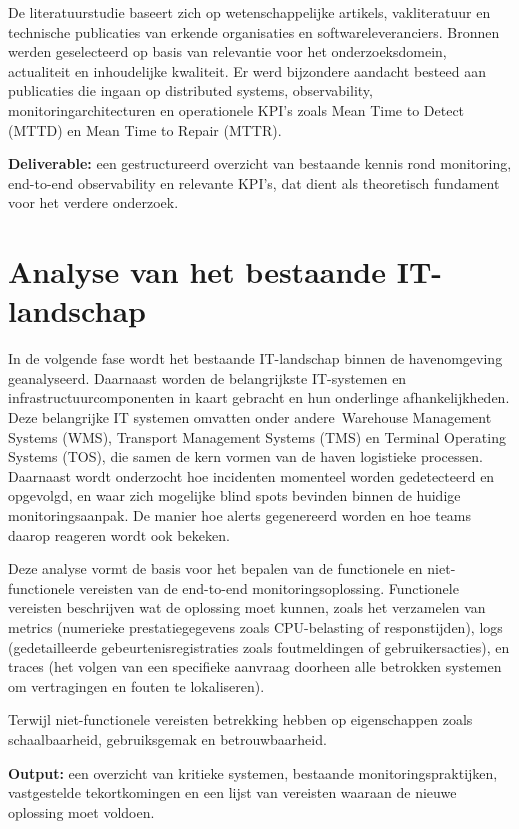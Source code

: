 De literatuurstudie baseert zich op wetenschappelijke artikels, vakliteratuur en technische publicaties van erkende organisaties en softwareleveranciers. Bronnen werden geselecteerd op basis van relevantie voor het onderzoeksdomein, actualiteit en inhoudelijke kwaliteit. Er werd bijzondere aandacht besteed aan publicaties die ingaan op distributed systems, observability, monitoringarchitecturen en operationele KPI’s zoals Mean Time to Detect (MTTD) en Mean Time to Repair (MTTR).

\textbf{Deliverable:} een gestructureerd overzicht van bestaande kennis rond monitoring, end-to-end observability en relevante KPI’s, dat dient als theoretisch fundament voor het verdere onderzoek.

\section{Analyse van het bestaande IT-landschap}

In de volgende fase wordt het bestaande IT-landschap binnen de havenomgeving geanalyseerd. Daarnaast worden de belangrijkste IT-systemen en infrastructuurcomponenten in kaart gebracht en hun onderlinge afhankelijkheden. Deze belangrijke IT systemen omvatten onder andere Warehouse Management Systems (WMS), Transport Management Systems (TMS) en Terminal Operating Systems (TOS), die samen de kern vormen van de haven logistieke processen. Daarnaast wordt onderzocht hoe incidenten momenteel worden gedetecteerd en opgevolgd, en waar zich mogelijke blind spots bevinden binnen de huidige monitoringsaanpak. De manier hoe alerts gegenereerd worden en hoe teams daarop reageren wordt ook bekeken.

Deze analyse vormt de basis voor het bepalen van de functionele en niet-functionele vereisten van de end-to-end monitoringsoplossing. Functionele vereisten beschrijven wat de oplossing moet kunnen, zoals het verzamelen van metrics (numerieke prestatiegegevens zoals CPU-belasting of responstijden), logs (gedetailleerde gebeurtenisregistraties zoals foutmeldingen of gebruikersacties), en traces (het volgen van een specifieke aanvraag doorheen alle betrokken systemen om vertragingen en fouten te lokaliseren).

Terwijl niet-functionele vereisten betrekking hebben op eigenschappen zoals schaalbaarheid, gebruiksgemak en betrouwbaarheid.

\textbf{Output:} een overzicht van kritieke systemen, bestaande monitoringspraktijken, vastgestelde tekortkomingen en een lijst van vereisten waaraan de nieuwe oplossing moet voldoen.

